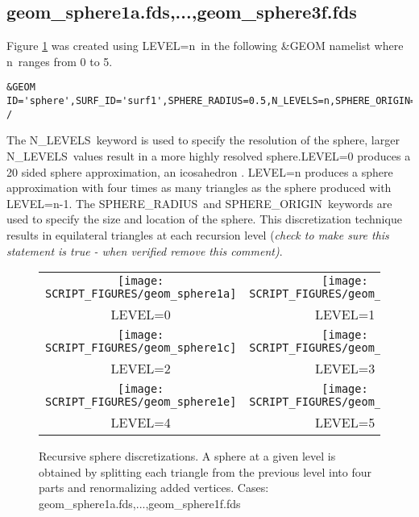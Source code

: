 \documentclass[12pt]{article}
\begin{document}
\subsection{geom\_sphere1a.fds,...,geom\_sphere3f.fds}
Figure \ref{fig:geom_sphere} was created using {\ct LEVEL=n}\
in the following \&GEOM namelist
where {\ct n}\ ranges from 0 to 5.

{\scriptsize
\begin{verbatim}
&GEOM ID='sphere',SURF_ID='surf1',SPHERE_RADIUS=0.5,N_LEVELS=n,SPHERE_ORIGIN=0.0,0.0,0.0 /
\end{verbatim}
}

The {\ct N\_LEVELS}\ keyword is used
to specify the resolution of the sphere, larger {\ct N\_LEVELS}\ values result
in a more highly resolved sphere.{\ct LEVEL=0} produces a 20 sided sphere approximation, an icosahedron .
{\ct LEVEL=n} produces a sphere approximation with four times as many triangles as the
sphere produced with {\ct LEVEL=n-1}.
The {\ct SPHERE\_RADIUS}\ and {\ct SPHERE\_ORIGIN}\ keywords are used to specify
the size and location of the sphere.  This discretization technique results in equilateral triangles at each recursion level {(\em check to make sure this statement is true - when verified remove this comment)}.


\begin{figure}[\figoptions]
\begin{center}
\begin{tabular}{cc}
 \texttt{[image: SCRIPT\_FIGURES/geom\_sphere1a]}&
 \texttt{[image: SCRIPT\_FIGURES/geom\_sphere1b]}\\
 LEVEL=0&LEVEL=1\\
 \texttt{[image: SCRIPT\_FIGURES/geom\_sphere1c]}&
 \texttt{[image: SCRIPT\_FIGURES/geom\_sphere1d]}\\
 LEVEL=2&LEVEL=3\\
 \texttt{[image: SCRIPT\_FIGURES/geom\_sphere1e]}&
 \texttt{[image: SCRIPT\_FIGURES/geom\_sphere1f]}\\
 LEVEL=4&LEVEL=5\\
  \end{tabular}
\end{center}
 \caption{Recursive sphere discretizations.  A sphere at a given level is
 obtained by splitting each triangle from the previous level into four parts and renormalizing added vertices. Cases: geom\_sphere1a.fds,...,geom\_sphere1f.fds}
\label{fig:geom_sphere}
\end{figure}
\end{document}
